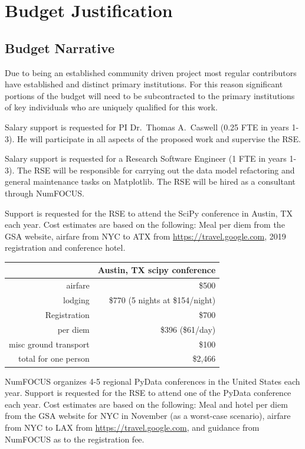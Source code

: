 \documentclass[12pt]{article}
\numberwithin{page}{section}
\begin{document}
\newpage
\section{Budget Justification}
\setcounter{page}{1}
\subsection{Budget Narrative}

Due to being an established community driven project most regular
contributors have established and distinct primary institutions.  For
this reason significant portions of the budget will need to be
subcontracted to the primary institutions of key individuals who are
uniquely qualified for this work.

Salary support is requested for PI Dr.\ Thomas A.\ Caswell (0.25 FTE in
years 1-3).  He will participate in all aspects of the proposed work
and supervise the RSE.

Salary support is requested for a Research Software Engineer (1 FTE in
years 1-3).  The RSE will be responsible for carrying out the data
model refactoring and general maintenance tasks on Matplotlib.  The
RSE will be hired as a consultant through NumFOCUS.

Support is requested for the RSE to attend the SciPy conference in
Austin, TX each year.  Cost estimates are based on the following: Meal
per diem from the GSA website, airfare from NYC to ATX from
\url{https://travel.google.com}, 2019 registration and conference hotel.

\begin{tabular}{|r|r|}
  \hline
  & Austin, TX scipy conference\\\hline
  airfare & \$500 \\\hline
  lodging & \$770 (5 nights at \$154/night) \\\hline
  Registration & \$700 \\\hline
  per diem & \$396 (\$61/day) \\\hline
  misc ground transport & \$100 \\\hline\hline
  total for one person & \$2,466    \\\hline
\end{tabular}


NumFOCUS organizes 4-5 regional PyData conferences in the United
States each year.  Support is requested for the RSE to attend one of
the PyData conference each year.  Cost estimates are based on the
following: Meal and hotel per diem from the GSA website for NYC in
November (as a worst-case scenario), airfare from NYC to LAX from
\url{https://travel.google.com}, and guidance from NumFOCUS as to the
registration fee.
\end{document}
